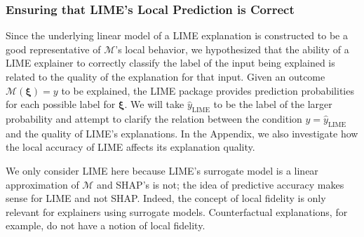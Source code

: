 \documentclass[mnsc,blindrev]{informs3}
\begin{document}
        \subsubsection{Ensuring that LIME's Local Prediction is Correct} 
            \label{sec:e_fidelity}
            Since the underlying linear model of a LIME explanation is constructed to be a good representative of $\mathcal{M}$'s local behavior, we hypothesized that the ability of a LIME explainer to correctly classify the label of the input being explained is related to the quality of the explanation for that input. Given an outcome $\mathcal{M}(\boldsymbol{\xi}) = y$ to be explained, the LIME package provides prediction probabilities for each possible label for $\boldsymbol{\xi}$. We will take $\hat{y}_{\text{LIME}}$ to be the label of the larger probability and attempt to clarify the relation between the condition $y = \hat{y}_{\text{LIME}}$ and the quality of LIME's explanations. In the Appendix, we also investigate how the local accuracy of LIME affects its explanation quality. 
        
            We only consider LIME here because LIME's surrogate model is a linear approximation of $\mathcal{M}$ and SHAP's is not; the idea of predictive accuracy makes sense for LIME and not SHAP. Indeed, the concept of local fidelity is only relevant for explainers using surrogate models. Counterfactual explanations, for example, do not have a notion of local fidelity. 
            
        
\end{document}
